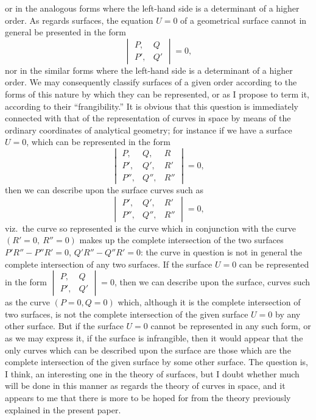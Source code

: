 \documentclass[11pt]{article}
\begin{document}
or in the analogous forms where the left-hand side is a determinant of a higher
order. As regards surfaces, the equation $U=0$ of a geometrical surface cannot in
general be presented in the form
\[ \begin{vmatrix} P, & Q \\ P', & Q' \end{vmatrix}=0, \]
nor in the similar forms where the left-hand side is a determinant of a higher order.
We may consequently classify surfaces of a given order according to the forms of this
nature by which they can be represented, or as I propose to term it, according to
their ``frangibility.'' It is obvious that this question is immediately connected with that
of the representation of curves in space by means of the ordinary coordinates of
analytical geometry; for instance if we have a surface $U=0$, which can be represented
in the form
\[ \begin{vmatrix} P, & Q, & R \\ P', & Q', & R' \\ P'', & Q'', & R'' \end{vmatrix}=0, \]
then we can describe upon the surface curves such as
\[ \begin{vmatrix} P', & Q', & R' \\ P'', & Q'', & R'' \end{vmatrix}=0, \]
viz.\ the curve so represented is the curve which in conjunction with the curve
$(R'=0,\ R''=0)$ makes up the complete intersection of the two surfaces
$P'R''-P''R'=0$, $Q'R''-Q''R'=0$: the curve in question is not in general the complete
intersection of any two surfaces. If the surface $U=0$ can be represented in the form
$\begin{vmatrix}P, & Q \\ P', & Q'\end{vmatrix}=0$,
then we can describe upon the surface, curves such as the curve $(P=0, Q=0)$ which,
although it is the complete intersection of two surfaces, is not the complete intersection
of the given surface $U=0$ by any other surface. But if the surface $U=0$ cannot be
represented in any such form, or as we may express it, if the surface is infrangible, then
it would appear that the only curves which can be described upon the surface are those
which are the complete intersection of the given surface by some other surface. The
question is, I think, an interesting one in the theory of surfaces, but I doubt whether
much will be done in this manner as regards the theory of curves in space, and it
appears to me that there is more to be hoped for from the theory previously explained
in the present paper.
\end{document}
